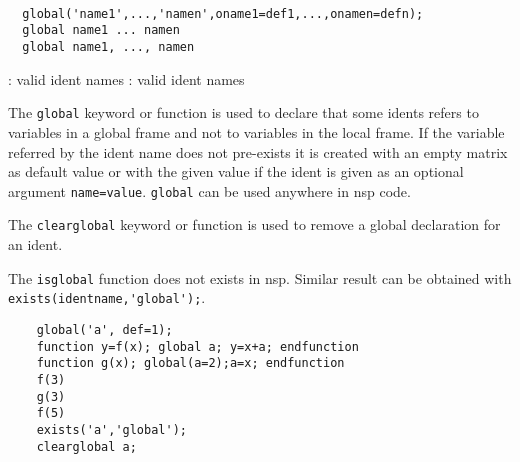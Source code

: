 \begin{mandesc}
   \\ %
   \\ %
   \\ %
\end{mandesc}
\begin{calling_sequence}
\begin{verbatim}
  global('name1',...,'namen',oname1=def1,...,onamen=defn);
  global name1 ... namen
  global name1, ..., namen
\end{verbatim}
\end{calling_sequence}
\begin{parameters}
  \begin{varlist}
    : valid ident names
    : valid ident names
  \end{varlist}
\end{parameters}
\begin{mandescription}
  The \verb!global! keyword or function is used to declare that some idents 
  refers to variables in a global frame and not to variables in the local frame.
  If the variable referred by the ident name does not pre-exists 
  it is created with an empty matrix as default value or with the given value 
  if the ident is given as an optional argument \verb!name=value!. 
  \verb!global! can be used anywhere in nsp code.
  
  The \verb!clearglobal! keyword or function is used to remove a global 
  declaration for an ident.
  
  The \verb!isglobal! function does not exists in nsp. Similar result 
  can be obtained with \verb!exists(identname,'global');!.
  
\end{mandescription}
\begin{examples}
  \begin{Verbatim}
    global('a', def=1); 
    function y=f(x); global a; y=x+a; endfunction
    function g(x); global(a=2);a=x; endfunction
    f(3)
    g(3)
    f(5)
    exists('a','global');
    clearglobal a;
  \end{Verbatim}
\end{examples}
\begin{manseealso}
     
\end{manseealso}
